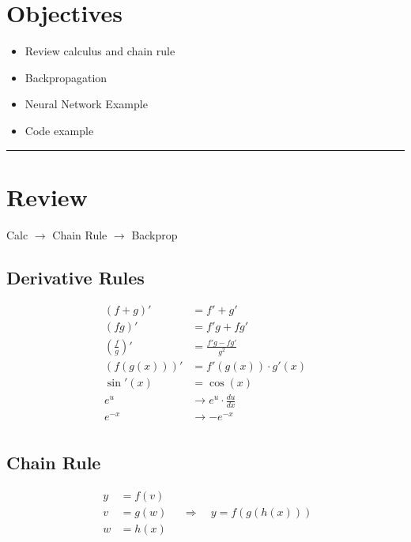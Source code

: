 \section*{Objectives}
\begin{itemize}
    \item Review calculus and chain rule
    \item Backpropagation
    \item Neural Network Example
    \item Code example
\end{itemize}

\rule[0.0051in]{\textwidth}{0.00025in}
\section{Review}
Calc $\longrightarrow$ Chain Rule $\longrightarrow$ Backprop

\subsection{Derivative Rules}
\[
\begin{aligned}
(f + g)' &= f' + g' \\
(fg)' &= f' g + f g' \\
\left( \frac{f}{g} \right)' &= \frac{f'g - fg'}{g^2} \\
(f(g(x)))' &= f'(g(x)) \cdot g'(x) \\
\sin'(x) &= \cos(x)
\\
e^{u} &\rightarrow e^{u}\cdot \frac{du}{dx} \\
e^{-x} &\rightarrow-e^{-x} \\
\end{aligned}
\]

\subsection{Chain Rule}
\[
\begin{aligned}
    y &= f(v) \\
    v &= g(w) \\
    w &= h(x)
\end{aligned}
\quad \Rightarrow \quad
y = f(g(h(x)))
\]

